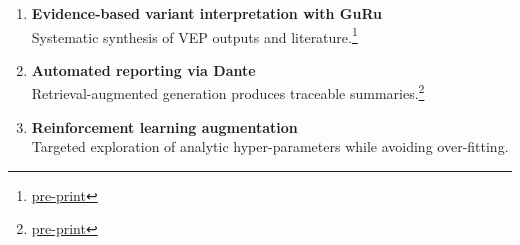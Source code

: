 \begin{enumerate}
  \item \textbf{Evidence-based variant interpretation with GuRu}\\
  Systematic synthesis of VEP outputs and literature.\citep{Lawless2025GuRu}\footnote{\href{https://doi.org/10.1101/YYYYYY}{pre-print}}
  
  \item \textbf{Automated reporting via Dante}\\
  Retrieval-augmented generation produces traceable summaries.\footnote{\href{https://doi.org/10.1101/ZZZZZZ}{pre-print}}
  
  \item \textbf{Reinforcement learning augmentation}\\
  Targeted exploration of analytic hyper-parameters while avoiding over-fitting.\citep{Lawless2025Actor}
\end{enumerate}





